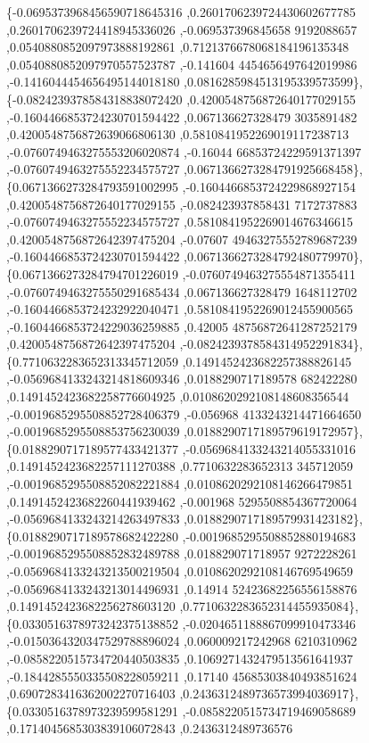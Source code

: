 \begin{DoxyCode}
\{-0.0695373968456590718645316 ,0.2601706239724430602677785 ,0.2601706239724418945336026 ,-0.069537396845658
      9192088657 ,0.0540880852097973888192861 ,0.7121376678068184196135348 ,0.0540880852097970557523787 ,-0.141604
      4454656497642019986 ,-0.1416044454656495144018180 ,0.0816285984513195339573599\},
\{-0.0824239378584318838072420 ,0.4200548756872640177029155 ,-0.1604466853724230701594422 ,0.067136627328479
      3035891482 ,0.4200548756872639066806130 ,0.5810841952269019117238713 ,-0.0760749463275553206020874 ,-0.16044
      66853724229591371397 ,-0.0760749463275552234575727 ,0.0671366273284791925668458\},
\{0.0671366273284793591002995 ,-0.1604466853724229868927154 ,0.4200548756872640177029155 ,-0.082423937858431
      7172737883 ,-0.0760749463275552234575727 ,0.5810841952269014676346615 ,0.4200548756872642397475204 ,-0.07607
      49463275552789687239 ,-0.1604466853724230701594422 ,0.0671366273284792480779970\},
\{0.0671366273284794701226019 ,-0.0760749463275554871355411 ,-0.0760749463275550291685434 ,0.067136627328479
      1648112702 ,-0.1604466853724232922040471 ,0.5810841952269012455900565 ,-0.1604466853724229036259885 ,0.42005
      48756872641287252179 ,0.4200548756872642397475204 ,-0.0824239378584314952291834\},
\{0.7710632283652313345712059 ,0.1491452423682257388826145 ,-0.0569684133243214818609346 ,0.0188290717189578
      682422280 ,0.1491452423682258776604925 ,0.0108620292108148608356544 ,-0.0019685295508852728406379 ,-0.056968
      4133243214471664650 ,-0.0019685295508853756230039 ,0.0188290717189579619172957\},
\{0.0188290717189577433421377 ,-0.0569684133243214055331016 ,0.1491452423682257111270388 ,0.7710632283652313
      345712059 ,-0.0019685295508852082221884 ,0.0108620292108146266479851 ,0.1491452423682260441939462 ,-0.001968
      5295508854367720064 ,-0.0569684133243214263497833 ,0.0188290717189579931423182\},
\{0.0188290717189578682422280 ,-0.0019685295508852880194683 ,-0.0019685295508852832489788 ,0.018829071718957
      9272228261 ,-0.0569684133243213500219504 ,0.0108620292108146769549659 ,-0.0569684133243213014496931 ,0.14914
      52423682256556158876 ,0.1491452423682256278603120 ,0.7710632283652314455935084\},
\{0.0330516378973242375138852 ,-0.0204651188867099910473346 ,-0.0150364320347529788896024 ,0.060009217242968
      6210310962 ,-0.0858220515734720440503835 ,0.1069271432479513561641937 ,-0.1844285550335508228059211 ,0.17140
      45685303840493851624 ,0.6907283416362002270716403 ,0.2436312489736573994036917\},
\{0.0330516378973239599581291 ,-0.0858220515734719469058689 ,0.1714045685303839106072843 ,0.2436312489736576

\end{DoxyCode}
